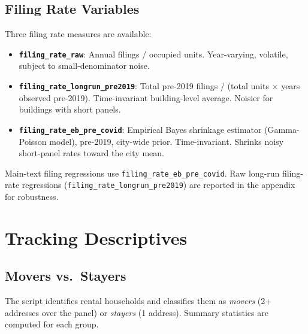 \documentclass[
  11pt,
]{article}
\providecommand{\tightlist}{%
  \setlength{\itemsep}{0pt}\setlength{\parskip}{0pt}}
\begin{document}
\subsection{Filing Rate Variables}\label{filing-rate-variables}

Three filing rate measures are available:

\begin{itemize}
\tightlist
\item
  \textbf{\texttt{filing\_rate\_raw}}: Annual filings / occupied units.
  Year-varying, volatile, subject to small-denominator noise.
\item
  \textbf{\texttt{filing\_rate\_longrun\_pre2019}}: Total pre-2019
  filings / (total units \(\times\) years observed pre-2019).
  Time-invariant building-level average. Noisier for buildings with
  short panels.
\item
  \textbf{\texttt{filing\_rate\_eb\_pre\_covid}}: Empirical Bayes
  shrinkage estimator (Gamma-Poisson model), pre-2019, city-wide prior.
  Time-invariant. Shrinks noisy short-panel rates toward the city mean.
\end{itemize}

Main-text filing regressions use \texttt{filing\_rate\_eb\_pre\_covid}.
Raw long-run filing-rate regressions
(\texttt{filing\_rate\_longrun\_pre2019}) are reported in the appendix
for robustness.

\section{Tracking Descriptives}\label{tracking-descriptives}

\subsection{Movers vs.~Stayers}\label{movers-vs.-stayers}

The script identifies rental households and classifies them as
\emph{movers} (2+ addresses over the panel) or \emph{stayers} (1
address). Summary statistics are computed for each group.
\end{document}
